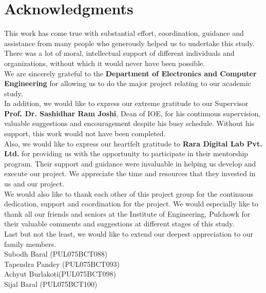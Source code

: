 \documentclass[12pt]{report}
\begin{document}
\chapter*{Acknowledgments}
This work has come true with substantial effort, coordination, guidance and assistance from many people who generously helped us to undertake this study. There was a lot of moral, intellectual support of different individuals and organizations, without which it would never have been possible.\\
We are sincerely grateful to the \textbf{Department of Electronics and Computer Engineering} for allowing us to do the major project relating to our academic study.\\
In addition, we would like to express our extreme gratitude to our Supervisor \textbf{Prof. Dr. Sashidhar Ram Joshi}, Dean of IOE, for his continuous supervision, valuable suggestions and encouragement despite his busy schedule. Without his support, this work would not have been completed. \\
Also, we would like to express our heartfelt gratitude to \textbf{Rara Digital Lab Pvt. Ltd.}  for providing us with the opportunity to participate in their mentorship program. Their support and guidance were invaluable in helping us develop and execute our project. We appreciate the time and resources that they invested in us and our project.\\
We would also like to thank each other of this project group for the continuous dedication, support and coordination for the project. We would especially like to thank all our friends and seniors at the Institute of Engineering, Pulchowk for their valuable comments and suggestions at different stages of this study.\\
Last but not the least, we would like to extend our deepest appreciation to our family members.\\
Subodh Baral    (PUL075BCT088)\\
Tapendra Pandey (PUL075BCT093)\\
Achyut Burlakoti(PUL075BCT098)\\
Sijal Baral     (PUL075BCT100)\\
\end{document}

